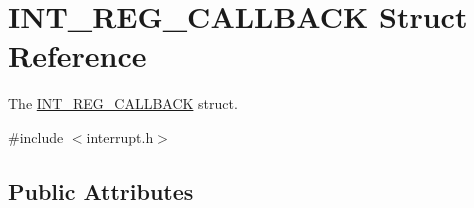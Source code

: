 \hypertarget{structINT__REG__CALLBACK}{}\section{I\+N\+T\+\_\+\+R\+E\+G\+\_\+\+C\+A\+L\+L\+B\+A\+CK Struct Reference}
\label{structINT__REG__CALLBACK}


The \hyperlink{structINT__REG__CALLBACK}{I\+N\+T\+\_\+\+R\+E\+G\+\_\+\+C\+A\+L\+L\+B\+A\+CK} struct.  




{\ttfamily \#include $<$interrupt.\+h$>$}

\subsection*{Public Attributes}
